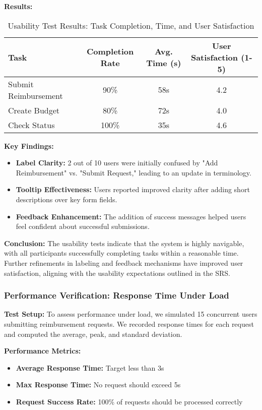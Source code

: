\documentclass[12pt, titlepage]{article}
\begin{document}
\textbf{Results:}
\begin{table}[h]
\centering
\begin{tabular}{|l|c|c|c|}
    \hline
    \textbf{Task} & \textbf{Completion Rate} & \textbf{Avg. Time (s)} & \textbf{User Satisfaction (1-5)} \\
    \hline
    Submit Reimbursement & 90\% & 58s & 4.2 \\
    \hline
    Create Budget & 80\% & 72s & 4.0 \\
    \hline
    Check Status & 100\% & 35s & 4.6 \\
    \hline
\end{tabular}
\caption{Usability Test Results: Task Completion, Time, and User Satisfaction}
\label{tab:usability-results}
\end{table}

\textbf{Key Findings:}  
\begin{itemize}
    \item \textbf{Label Clarity:} 2 out of 10 users were initially confused by "Add Reimbursement" vs. "Submit Request," leading to an update in terminology.
    \item \textbf{Tooltip Effectiveness:} Users reported improved clarity after adding short descriptions over key form fields.
    \item \textbf{Feedback Enhancement:} The addition of success messages helped users feel confident about successful submissions.
\end{itemize}

\textbf{Conclusion:}  
The usability tests indicate that the system is highly navigable, with all participants successfully completing tasks within a reasonable time. Further refinements in labeling and feedback mechanisms have improved user satisfaction, aligning with the usability expectations outlined in the SRS.

\subsubsection{Performance Verification: Response Time Under Load}
\label{sec:performance-proof}

\textbf{Test Setup:}  
To assess performance under load, we simulated 15 concurrent users submitting reimbursement requests. We recorded response times for each request and computed the average, peak, and standard deviation.

\textbf{Performance Metrics:}
\begin{itemize}
    \item \textbf{Average Response Time:} Target less than 3s
    \item \textbf{Max Response Time:} No request should exceed 5s
    \item \textbf{Request Success Rate:} 100\% of requests should be processed correctly
\end{itemize}
\end{document}
